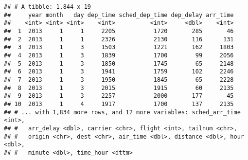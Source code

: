 \documentclass[]{article}
\newenvironment{Shaded}{\begin{snugshade}}{\end{snugshade}}
\newcommand{\KeywordTok}[1]{\textcolor[rgb]{0.13,0.29,0.53}{\textbf{#1}}}
\newcommand{\DecValTok}[1]{\textcolor[rgb]{0.00,0.00,0.81}{#1}}
\newcommand{\StringTok}[1]{\textcolor[rgb]{0.31,0.60,0.02}{#1}}
\newcommand{\CommentTok}[1]{\textcolor[rgb]{0.56,0.35,0.01}{\textit{#1}}}
\newcommand{\OperatorTok}[1]{\textcolor[rgb]{0.81,0.36,0.00}{\textbf{#1}}}
\newcommand{\NormalTok}[1]{#1}
\begin{document}
\begin{Shaded}
\end{Shaded}

\begin{verbatim}
## # A tibble: 1,844 x 19
##     year month   day dep_time sched_dep_time dep_delay arr_time
##    <int> <int> <int>    <int>          <int>     <dbl>    <int>
##  1  2013     1     1     2205           1720       285       46
##  2  2013     1     1     2326           2130       116      131
##  3  2013     1     3     1503           1221       162     1803
##  4  2013     1     3     1839           1700        99     2056
##  5  2013     1     3     1850           1745        65     2148
##  6  2013     1     3     1941           1759       102     2246
##  7  2013     1     3     1950           1845        65     2228
##  8  2013     1     3     2015           1915        60     2135
##  9  2013     1     3     2257           2000       177       45
## 10  2013     1     4     1917           1700       137     2135
## # ... with 1,834 more rows, and 12 more variables: sched_arr_time <int>,
## #   arr_delay <dbl>, carrier <chr>, flight <int>, tailnum <chr>,
## #   origin <chr>, dest <chr>, air_time <dbl>, distance <dbl>, hour <dbl>,
## #   minute <dbl>, time_hour <dttm>
\end{verbatim}

\begin{Shaded}
\end{Shaded}
\end{document}
